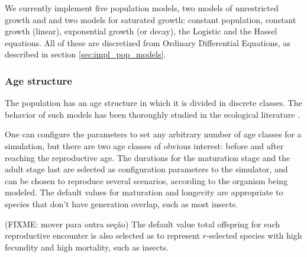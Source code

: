\documentclass[10pt]{article}
\begin{document}
We currently implement five population models, two models of
unrestricted growth and and two models for saturated growth: constant
population, constant growth (linear), exponential growth (or decay),
the Logistic and the Hassel \cite{Has75} equations. All of these are
discretized from Ordinary Differential Equations, as described in
section \ref{sec:impl_pop_models}.






\subsubsection{Age structure}

The population has an age structure in which it is divided in discrete
classes. The behavior of such models has been thoroughly studied in
the ecological literature \cite{nisbet82}.

One can configure the parameters to set any arbitrary number of age
classes for a simulation, but there are two age classes of obvious
interest: before and after reaching the reproductive age. The
durations for the maturation stage and the adult stage last are
selected as configuration parameters to the simulator, and can be
chosen to reproduce several scenarios, according to the organism being
modeled. The default values for maturation and longevity are
appropriate to species that don't have generation overlap, such as
most insects.

(FIXME: mover para outra seção) The default value total offspring for
each reproductive encounter is also selected as to represent
$r$-selected species with high fecundity and high mortality, such as
insects.
\end{document}
